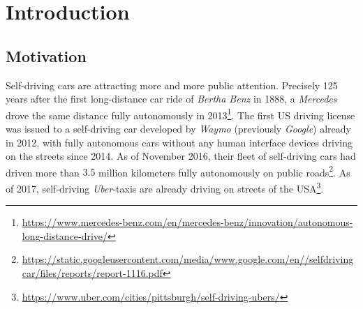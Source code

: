 
\chapter{Introduction} %

\label{ch:intro} %


\newcommand{\keyword}[1]{\textit{#1}}
\newcommand{\tabhead}[1]{\textbf{#1}}
\newcommand{\code}[1]{\texttt{#1}}
\newcommand{\file}[1]{\texttt{\bfseries#1}}
\newcommand{\option}[1]{\texttt{\itshape#1}}
\newcommand{\batchnorm}{batch normalization }
\newcommand{\Batchnorm}{Batch normalization }



\section{Motivation}

Self-driving cars are attracting more and more public attention. Precisely 125 years after the first long-distance car ride of \keyword{Bertha Benz} in 1888, a \keyword{Mercedes} drove the same distance fully autonomously in 2013\footnote{\url{https://www.mercedes-benz.com/en/mercedes-benz/innovation/autonomous-long-distance-drive/}}.
The first US driving license was issued to a self-driving car developed by \keyword{Waymo} (previously \keyword{Google}) already in 2012, with fully autonomous cars without any human interface devices driving on the streets since 2014. As of November 2016, their fleet of self-driving cars had driven more than $3.5$ million kilometers fully autonomously on public roads\footnote{\url{https://static.googleusercontent.com/media/www.google.com/en//selfdrivingcar/files/reports/report-1116.pdf}}. As of 2017, self-driving \keyword{Uber}-taxis are already driving on streets of the USA\footnote{\url{https://www.uber.com/cities/pittsburgh/self-driving-ubers/}}. 

